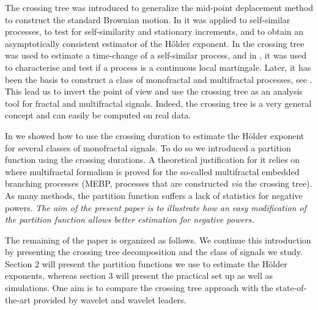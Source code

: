 \documentclass[a4paper]{article}
\begin{document}
 The crossing tree was introduced to generalize the mid-point deplacement method to construct the standard Brownian motion. In \cite{JoneS04} it was applied to self-similar processes, to test for self-similarity and stationary increments, and to obtain an asymptotically consistent estimator of the H\"older exponent. In \cite{ArrJon06} the crossing tree was used to estimate a time-change of a self-similar process, and in \cite{JonRol}, it was used to characterise and test if a process is a continuous local martingale. Later, it has been the basis to construct a class of monofractal and multifractal processes, see \cite{DecrJ12, DecrHJ}. This lead us to invert the point of view and use the crossing tree as an analysis tool for fractal and multifractal signals. Indeed, the crossing tree is a very general concept  and can easily be computed on real data.

In \cite{DecrAJ13,DecrA15} we showed how to use the crossing duration to estimate the H\"older exponent for several classes of monofractal signals. To do so we introduced a partition function using the crossing durations. A theoretical justification for it relies on  \cite{DecrJ12, DecrHJ} where multifractal formalism is proved for the so-called multifractal embedded branching processes (MEBP, processes that are constructed {\it via } the crossing tree). As many methods, the partition function suffers a lack of statistics for negative powers. {\em The aim of the present paper is to illustrate
how an easy modification of the partition function allows better estimation for negative powers. }

The remaining of the paper is organized as follows. We continue this introduction by presenting the crossing tree decomposition and the class of signals we study. Section 2 will present the partition functions we use to estimate the H\"older exponents, whereas section 3 will present the practical set up as well as simulations. One aim is to compare the crossing tree approach with the state-of-the-art provided by wavelet and wavelet leaders. 
\end{document}
